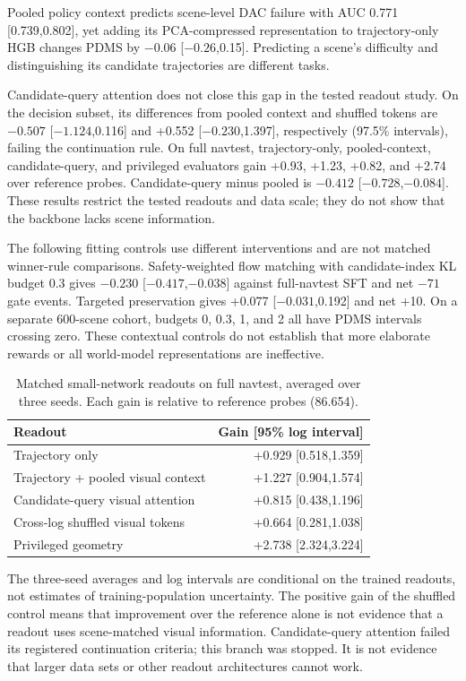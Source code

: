 \documentclass[10pt,letterpaper]{article}
\begin{document}
Pooled policy context predicts scene-level DAC failure with AUC 0.771 [0.739,0.802], yet adding its PCA-compressed representation to trajectory-only HGB changes PDMS by $-0.06$ [$-0.26$,0.15]. Predicting a scene's difficulty and distinguishing its candidate trajectories are different tasks.

Candidate-query attention does not close this gap in the tested readout study. On the decision subset, its differences from pooled context and shuffled tokens are $-0.507$ [$-1.124$,0.116] and +0.552 [$-0.230$,1.397], respectively (97.5\% intervals), failing the continuation rule. On full navtest, trajectory-only, pooled-context, candidate-query, and privileged evaluators gain +0.93, +1.23, +0.82, and +2.74 over reference probes. Candidate-query minus pooled is $-0.412$ [$-0.728$,$-0.084$]. These results restrict the tested readouts and data scale; they do not show that the backbone lacks scene information.

The following fitting controls use different interventions and are not matched winner-rule comparisons. Safety-weighted flow matching with candidate-index KL budget 0.3 gives $-0.230$ [$-0.417$,$-0.038$] against full-navtest SFT and net $-71$ gate events. Targeted preservation gives +0.077 [$-0.031$,0.192] and net +10. On a separate 600-scene cohort, budgets 0, 0.3, 1, and 2 all have PDMS intervals crossing zero. These contextual controls do not establish that more elaborate rewards or all world-model representations are ineffective.


\begin{table}[H]
\centering\caption{Matched small-network readouts on full navtest, averaged over three seeds. Each gain is relative to reference probes (86.654).}
\begin{tabular}{lr}\toprule
Readout & Gain [95\% log interval]\\\midrule
Trajectory only & +0.929 [0.518,1.359]\\
Trajectory + pooled visual context & +1.227 [0.904,1.574]\\
Candidate-query visual attention & +0.815 [0.438,1.196]\\
Cross-log shuffled visual tokens & +0.664 [0.281,1.038]\\
Privileged geometry & +2.738 [2.324,3.224]\\\bottomrule
\end{tabular}
\end{table}
The three-seed averages and log intervals are conditional on the trained readouts, not estimates of training-population uncertainty. The positive gain of the shuffled control means that improvement over the reference alone is not evidence that a readout uses scene-matched visual information. Candidate-query attention failed its registered continuation criteria; this branch was stopped. It is not evidence that larger data sets or other readout architectures cannot work.
\end{document}
